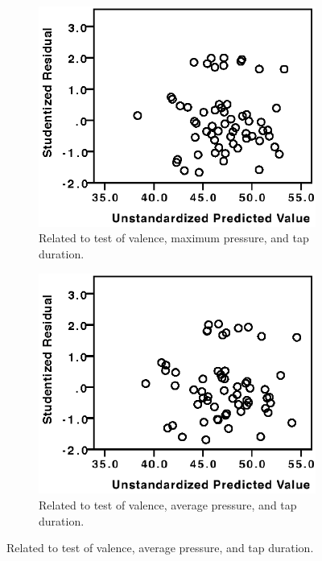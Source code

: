 \begin{figure}[h]
\centering
\begin{subfigure}[b]{0.45\textwidth}
    \centering
    \includegraphics[width=\textwidth]{images/linearity/ValMax.eps}
    \caption{Related to test of valence, maximum pressure, and tap duration.}
    \label{fig:valence_maximum}
\end{subfigure}
\quad
\begin{subfigure}[b]{0.45\textwidth}
    \centering
    \includegraphics[width=\textwidth]{images/linearity/ValAvg.eps}
    \caption{Related to test of valence, average pressure, and tap duration.}

\end{subfigure}
\end{figure}
